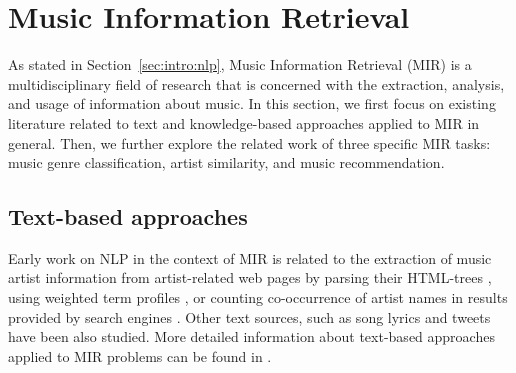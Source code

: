 \section{Music Information Retrieval}
\label{sec:SOA:mir}

As stated in Section~\ref{sec:intro:nlp}, Music Information Retrieval (MIR) is a multidisciplinary field of research that is concerned with the extraction, analysis, and usage of information about music. %
In this section, we first focus on existing literature related to text and knowledge-based approaches applied to MIR in general. Then, we further explore the related work of three specific MIR tasks: music genre classification, artist similarity, and music recommendation.

\subsection{Text-based approaches}

Early work on NLP in the context of MIR is related to the extraction of music artist information from artist-related web pages by parsing their HTML-trees \citep{Cohen2000}, using weighted term profiles \citep{Ellis2002,Whitman2002}, or counting co-occurrence of artist names in results provided by search engines \citep{Schedl2005}. Other text sources, such as song lyrics \citep{laurier2008multimodal,corona2015exploration} and tweets \citep{hauger2013million,schedl2012mining} have been also studied. %
More detailed information about text-based approaches applied to MIR problems can be found in \cite{Knees2013, Schedl2014}.

